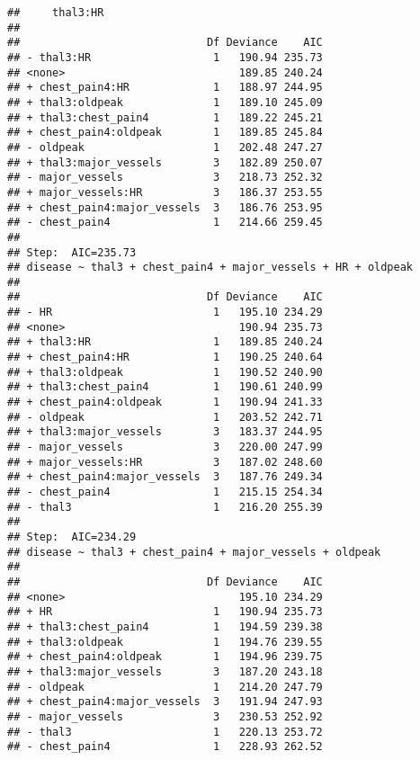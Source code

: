 \documentclass[]{article}
\begin{document}
\begin{verbatim}
##     thal3:HR
## 
##                             Df Deviance    AIC
## - thal3:HR                   1   190.94 235.73
## <none>                           189.85 240.24
## + chest_pain4:HR             1   188.97 244.95
## + thal3:oldpeak              1   189.10 245.09
## + thal3:chest_pain4          1   189.22 245.21
## + chest_pain4:oldpeak        1   189.85 245.84
## - oldpeak                    1   202.48 247.27
## + thal3:major_vessels        3   182.89 250.07
## - major_vessels              3   218.73 252.32
## + major_vessels:HR           3   186.37 253.55
## + chest_pain4:major_vessels  3   186.76 253.95
## - chest_pain4                1   214.66 259.45
## 
## Step:  AIC=235.73
## disease ~ thal3 + chest_pain4 + major_vessels + HR + oldpeak
## 
##                             Df Deviance    AIC
## - HR                         1   195.10 234.29
## <none>                           190.94 235.73
## + thal3:HR                   1   189.85 240.24
## + chest_pain4:HR             1   190.25 240.64
## + thal3:oldpeak              1   190.52 240.90
## + thal3:chest_pain4          1   190.61 240.99
## + chest_pain4:oldpeak        1   190.94 241.33
## - oldpeak                    1   203.52 242.71
## + thal3:major_vessels        3   183.37 244.95
## - major_vessels              3   220.00 247.99
## + major_vessels:HR           3   187.02 248.60
## + chest_pain4:major_vessels  3   187.76 249.34
## - chest_pain4                1   215.15 254.34
## - thal3                      1   216.20 255.39
## 
## Step:  AIC=234.29
## disease ~ thal3 + chest_pain4 + major_vessels + oldpeak
## 
##                             Df Deviance    AIC
## <none>                           195.10 234.29
## + HR                         1   190.94 235.73
## + thal3:chest_pain4          1   194.59 239.38
## + thal3:oldpeak              1   194.76 239.55
## + chest_pain4:oldpeak        1   194.96 239.75
## + thal3:major_vessels        3   187.20 243.18
## - oldpeak                    1   214.20 247.79
## + chest_pain4:major_vessels  3   191.94 247.93
## - major_vessels              3   230.53 252.92
## - thal3                      1   220.13 253.72
## - chest_pain4                1   228.93 262.52
\end{verbatim}
\end{document}
